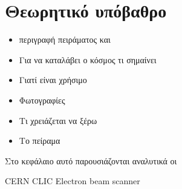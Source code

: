 \chapter{Θεωρητικό υπόβαθρο}
\begin{itemize}
\item περιγραφή πειράματος και
\item Για να καταλάβει ο κόσμος τι σημαίνει
\item Γιατί είναι χρήσιμο
\item Φωτογραφίες
\item Τι χρειάζεται να ξέρω
\item Το πείραμα
\end{itemize}

Στο κεφάλαιο αυτό παρουσιάζονται αναλυτικά οι 

CERN
CLIC
Electron beam scanner

